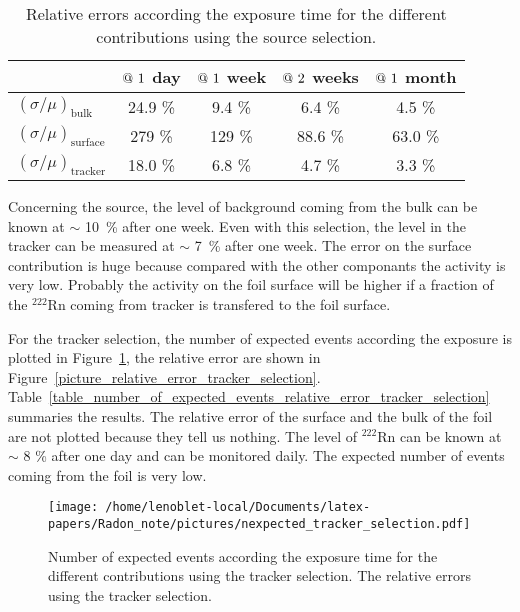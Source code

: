 \documentclass[main.tex]{subfiles}
\begin{document}
\begin{table}[h!]
\begin{center}
\begin{tabular}{l|c|c|c|c}
       & $\symbol{64}~1$ day  & $\symbol{64}~1$ week  & $\symbol{64}~2$ weeks & $\symbol{64}~1$ month  \\
\hline
$(\sigma / \mu)_{\text{bulk}}$    & 24.9 \% & 9.4  \% & 6.4  \% & 4.5  \% \\
$(\sigma / \mu)_{\text{surface}}$ & 279  \% & 129  \% & 88.6 \% & 63.0 \% \\
$(\sigma / \mu)_{\text{tracker}}$ & 18.0 \% & 6.8  \% & 4.7  \% & 3.3  \% \\
\hline
\end{tabular}
\end{center}
\caption{Relative errors according the exposure time for the different contributions using the source selection.}
\label{table_relative_error_source_selection}
\end{table}

\bigskip

\noindent Concerning the source, the level of background coming from the bulk can be known at $\sim$ 10~\% after one week. Even with this selection, the level in the tracker can be measured at  $\sim$ 7~\% after one week. The error on the surface contribution is huge because compared with the other componants the activity is very low. Probably the activity on the foil surface will be higher if a fraction of the $^{\text{222}}$Rn coming from tracker is transfered to the foil surface. 


\FloatBarrier
\bigskip


\noindent For the tracker selection, the number of expected events according the exposure is plotted in Figure~\ref{picture_number_of_expected_events_tracker_selection}, the relative error are shown in Figure~\ref{picture_relative_error_tracker_selection}. Table~\ref{table_number_of_expected_events_relative_error_tracker_selection} summaries the results. The relative error of the surface and the bulk of the foil are not plotted because they tell us nothing. The level of $^{\text{222}}$Rn can be known at $\sim$ 8 \% after one day and can be monitored daily. The expected number of events coming from the foil is very low.


\begin{figure}[h!]
\begin{center}
\texttt{[image: /home/lenoblet-local/Documents/latex-papers/Radon\_note/pictures/nexpected\_tracker\_selection.pdf]}
\caption{Number of expected events according the exposure time for the different contributions using the tracker selection. The relative errors using the tracker selection.}
\label{picture_number_of_expected_events_tracker_selection}
\end{center}
\end{figure}
\end{document}

